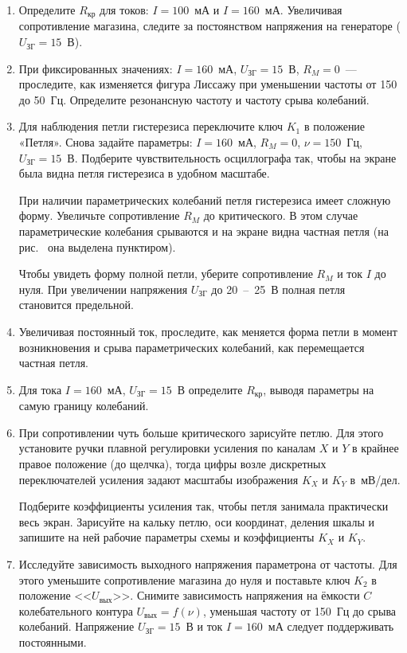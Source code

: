 \begin{lab:task}
\begin{enumerate}
\item 
Определите $R_\text{кр}$ для токов: $I = 100$~мА и $I = 160$~мА. Увеличивая сопротивление магазина, следите за постоянством напряжения на генераторе ($U_\text{ЗГ} = 15$~В). 

\item 
При фиксированных значениях: $I = 160$~мА, $U_\text{ЗГ} = 15$~В, $R_M = 0$~--- проследите, как изменяется фигура Лиссажу при уменьшении частоты от 150 до 50~Гц. Определите резонансную частоту и частоту срыва колебаний.

\item 
Для наблюдения петли гистерезиса переключите ключ $K_1$ в положение «Петля». Снова задайте параметры: $I = 160$~мА, $R_M = 0$, $\nu = 150$~Гц, $U_\text{ЗГ} = 15$~В. Подберите чувствительность осциллографа так, чтобы на экране была видна петля гистерезиса в удобном масштабе. 

При наличии параметрических колебаний петля гистерезиса имеет сложную форму. Увеличьте сопротивление $R_M$ до критического. В этом случае параметрические колебания срываются и на экране видна частная петля (на рис.~ она выделена пунктиром). 

Чтобы увидеть форму полной петли, уберите сопротивление $R_M$ и ток $I$ до нуля. При увеличении напряжения $U_\text{ЗГ}$ до 20~--~25~В полная петля становится предельной. 

\item 
Увеличивая постоянный ток, проследите, как меняется форма петли в момент возникновения и срыва параметрических колебаний, как перемещается частная петля.

\item 
Для тока $I = 160$~мА, $U_\text{ЗГ} = 15$~В определите $R_\text{кр}$, выводя параметры на самую границу колебаний. 

\item 
При сопротивлении чуть больше критического зарисуйте петлю. Для этого установите ручки плавной регулировки усиления по каналам $X$ и $Y$ в крайнее правое положение (до щелчка), тогда цифры возле дискретных переключателей усиления задают масштабы изображения $K_X$ и $K_Y$ в~мВ/дел. 

Подберите коэффициенты усиления так, чтобы петля занимала практически весь экран. Зарисуйте на кальку петлю, оси координат, деления шкалы и запишите на ней рабочие параметры схемы и коэффициенты $K_X$ и $K_Y$. 

\item Исследуйте зависимость выходного напряжения параметрона от частоты. Для этого уменьшите сопротивление магазина до нуля и поставьте ключ $K_2$ в положение <<$U_\text{вых}$>>. Снимите зависимость напряжения на ёмкости $C$ колебательного контура $U_\text{вых} = f(\nu)$, уменьшая частоту от 150~Гц до срыва колебаний. Напряжение $U_\text{ЗГ} = 15$~В и ток $I = 160$~мА следует поддерживать постоянными.
\end{enumerate}


\end{lab:task}
